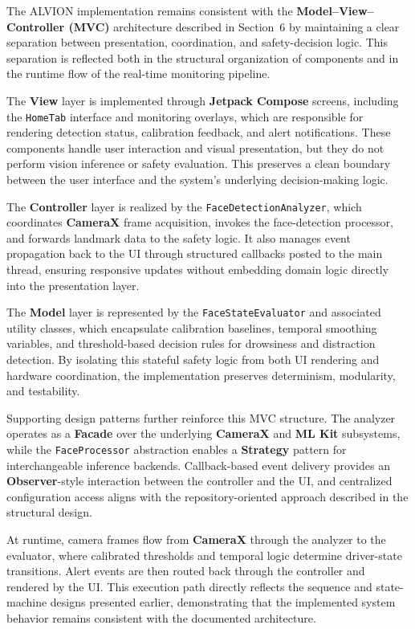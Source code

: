 \documentclass[11pt]{report}
\begin{document}
The ALVION implementation remains consistent with the \textbf{Model--View--Controller (MVC)} architecture described in Section~6 by maintaining a clear separation between presentation, coordination, and safety-decision logic. This separation is reflected both in the structural organization of components and in the runtime flow of the real-time monitoring pipeline.

The \textbf{View} layer is implemented through \textbf{Jetpack Compose} screens, including the \texttt{HomeTab} interface and monitoring overlays, which are responsible for rendering detection status, calibration feedback, and alert notifications. These components handle user interaction and visual presentation, but they do not perform vision inference or safety evaluation. This preserves a clean boundary between the user interface and the system's underlying decision-making logic.

The \textbf{Controller} layer is realized by the \texttt{FaceDetectionAnalyzer}, which coordinates \textbf{CameraX} frame acquisition, invokes the face-detection processor, and forwards landmark data to the safety logic. It also manages event propagation back to the UI through structured callbacks posted to the main thread, ensuring responsive updates without embedding domain logic directly into the presentation layer.

The \textbf{Model} layer is represented by the \texttt{FaceStateEvaluator} and associated utility classes, which encapsulate calibration baselines, temporal smoothing variables, and threshold-based decision rules for drowsiness and distraction detection. By isolating this stateful safety logic from both UI rendering and hardware coordination, the implementation preserves determinism, modularity, and testability.

Supporting design patterns further reinforce this MVC structure. The analyzer operates as a \textbf{Facade} over the underlying \textbf{CameraX} and \textbf{ML Kit} subsystems, while the \texttt{FaceProcessor} abstraction enables a \textbf{Strategy} pattern for interchangeable inference backends. Callback-based event delivery provides an \textbf{Observer}-style interaction between the controller and the UI, and centralized configuration access aligns with the repository-oriented approach described in the structural design.

At runtime, camera frames flow from \textbf{CameraX} through the analyzer to the evaluator, where calibrated thresholds and temporal logic determine driver-state transitions. Alert events are then routed back through the controller and rendered by the UI. This execution path directly reflects the sequence and state-machine designs presented earlier, demonstrating that the implemented system behavior remains consistent with the documented architecture.
\end{document}
